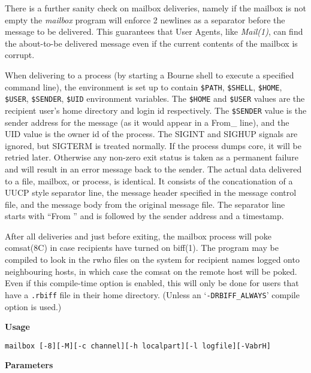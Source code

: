 There is a further sanity check on mailbox deliveries, namely if
the mailbox is not empty the {\em mailbox\/} program will
enforce 2 newlines as a separator before the message to be 
delivered. This guarantees that User Agents, like {\em Mail(1)\/},
can find the about-to-be delivered message even  if the current
contents of the mailbox is corrupt.

When delivering to a process (by starting a Bourne shell to 
execute a specified command line), the environment is set up to 
contain {\tt \$PATH}, {\tt \$SHELL}, {\tt \$HOME}, 
{\tt \$USER},
{\tt \$SENDER},  {\tt \$UID} environment variables. The 
{\tt \$HOME} and {\tt \$USER} values are the recipient user's home
directory and login id respectively. The {\tt \$SENDER} value is
the sender address for the message (as it would appear in a From\_
line), and the UID value is the owner id of the process. The
SIGINT and SIGHUP signals are ignored, but SIGTERM is treated
normally. If the process dumps core, it will be retried later.
Otherwise any non-zero exit status is taken as a permanent 
failure and will result in an error message back to the sender.
The actual data delivered to a file, mailbox,  or process, is
identical. It  consists of the concationation of a UUCP style
separator line, the message header specified in the message 
control file, and the message body from the original message file.
The separator line starts with ``From '' and is followed by the
sender address and a timestamp.

After all deliveries and just before exiting, the mailbox process
will poke comsat(8C) in case recipients have turned on biff(1).
The program may be compiled to look in the rwho files on the 
system for recipient names logged onto neighbouring hosts, in which
case the comsat on the remote host will be poked. Even if this
compile-time option is enabled, this will only be done for users
that have a {\tt .rbiff} file in their home directory. (Unless an
`{\tt -DRBIFF\_ALWAYS}' compile option is used.)

{\bf Usage}

\begin{tscreen}
\begin{verbatim}
mailbox [-8][-M][-c channel][-h localpart][-l logfile][-VabrH] 
\end{verbatim}
\end{tscreen}


{\bf Parameters}


